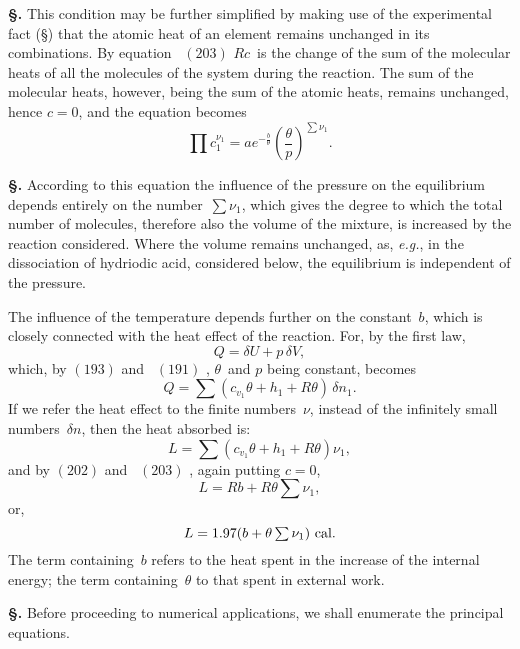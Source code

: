 \documentclass[12pt]{book}[2005/09/16]
\newcommand{\Section}[1]{
  \medskip\par\textbf{§\;#1}
  \label{section:#1}
}
\newcommand{\SecRef}[2][§\;]{\hyperref[section:#2.]{{\upshape #1#2}}}
\newcommand{\Eq}[1]{%
  \hyperref[eqn:#1]{\ensuremath{#1}}%
}
\newcommand{\PageSep}[1]{\ignorespaces}
\newcommand{\eg}{\emph{e.g.}}
\newcommand{\efrac}[2]{\tfrac{#1}{#2}}
\newcommand{\tsum}{\mathop{\textstyle\sum}\limits}
\newcommand{\Unit}[1]{\text{\upshape #1}}
\begin{document}
\Section{242.} This condition may be further simplified by
making use of the experimental fact (\SecRef{50}) that the atomic
heat of an element remains unchanged in its combinations.
By equation~\Eq{(203)} $Rc$~is the change of the sum of the
molecular heats of all the molecules of the system during
the reaction. The sum of the molecular heats, however,
being the sum of the atomic heats, remains unchanged,
hence $c = 0$, and the equation becomes
\[
\prod c_{1}^{\nu_{1}} = a e^{-\efrac{b}{\theta}} \left(\frac{\theta}{p}\right)^{\tsum \nu_{1}}.
\]

\Section{243.} According to this equation the influence of the
pressure on the equilibrium depends entirely on the number~$\tsum \nu_{1}$,
%
which gives the degree to which the total number of
molecules, therefore also the volume of the mixture, is
increased by the reaction considered. Where the volume
remains unchanged, as, \eg, in the dissociation of hydriodic
acid, considered below, the equilibrium is independent of
the pressure.

The influence of the temperature depends further on the
constant~$b$, which is closely connected with the heat effect
of the reaction. For, by the first law,
\[
Q = \delta U + p\, \delta V,
\]
which, by \Eq{(193)} and~\Eq{(191)}, $\theta$~and $p$ being constant, becomes
\[
Q = \tsum (c_{v_{1}} \theta + h_{1} + R\theta)\, \delta n_{1}.
\]
%
\PageSep{218}
If we refer the heat effect to the finite numbers~$\nu$, instead
of the infinitely small numbers~$\delta n$, then the heat absorbed is:
\[
L = \tsum (c_{v_{1}} \theta + h_{1} + R\theta) \nu_{1},
\]
and by \Eq{(202)} and~\Eq{(203)}, again putting $c = 0$,
\[
L = Rb + R\theta \tsum \nu_{1},
\]
or,
\[
L = 1.97 (b + \theta \tsum \nu_{1})~\Unit{cal.}
\]
The term containing~$b$ refers to the heat spent in the increase
of the internal energy; the term containing~$\theta$ to that spent
in external work.

\Section{244.} Before proceeding to numerical applications, we
shall enumerate the principal equations.
\end{document}
